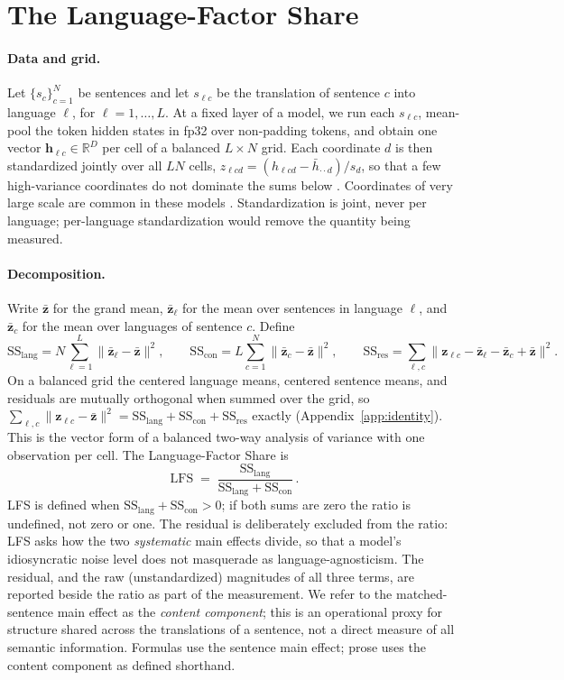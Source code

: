 \documentclass{article} %
\def\vh{{\bm{h}}}
\def\vz{{\bm{z}}}
\newcommand{\R}{\mathbb{R}}
\newcommand{\LFS}{\mathrm{LFS}}
\newcommand{\SSl}{\mathrm{SS}_{\mathrm{lang}}}
\newcommand{\SSc}{\mathrm{SS}_{\mathrm{con}}}
\newcommand{\SSr}{\mathrm{SS}_{\mathrm{res}}}
\begin{document}
\section{The Language-Factor Share}
\label{sec:method}

\paragraph{Data and grid.} Let $\{s_c\}_{c=1}^{N}$ be sentences and let
$s_{\ell c}$ be the translation of sentence $c$ into language $\ell$, for
$\ell = 1, \dots, L$. At a fixed layer of a model, we run each $s_{\ell c}$,
mean-pool the token hidden states in fp32 over non-padding tokens, and obtain
one vector $\vh_{\ell c} \in \R^{D}$ per cell of a balanced $L \times N$ grid.
Each coordinate $d$ is then standardized jointly over all $LN$ cells,
$z_{\ell c d} = (h_{\ell c d} - \bar h_{\cdot\cdot d}) / s_d$, so that a few
high-variance coordinates do not dominate the sums below
\citep{timkey2021rogue}. Coordinates of very large scale are common in these models \citep{kovaleva2021outlier,sun2024massive}. Standardization is joint, never per language;
per-language standardization would remove the quantity being measured.

\paragraph{Decomposition.} Write $\bar\vz$ for the grand mean, $\bar\vz_{\ell}$
for the mean over sentences in language $\ell$, and $\bar\vz_{c}$ for the mean
over languages of sentence $c$. Define
\begin{equation}
\SSl = N \sum_{\ell=1}^{L} \lVert \bar\vz_{\ell} - \bar\vz \rVert^2, \qquad
\SSc = L \sum_{c=1}^{N} \lVert \bar\vz_{c} - \bar\vz \rVert^2, \qquad
\SSr = \sum_{\ell, c} \lVert \vz_{\ell c} - \bar\vz_{\ell} - \bar\vz_{c} + \bar\vz \rVert^2 .
\label{eq:ss}
\end{equation}
On a balanced grid the centered language means, centered sentence means, and
residuals are mutually orthogonal when summed over the grid, so
$\sum_{\ell,c} \lVert \vz_{\ell c} - \bar\vz \rVert^2 = \SSl + \SSc + \SSr$
exactly (Appendix~\ref{app:identity}). This is the vector form of a balanced
two-way analysis of variance with one observation per cell. The
Language-Factor Share is
\begin{equation}
\LFS \;=\; \frac{\SSl}{\SSl + \SSc}\,.
\label{eq:lfs}
\end{equation}
LFS is defined when $\SSl + \SSc > 0$; if both sums are zero the ratio is
undefined, not zero or one. The residual is deliberately excluded from the ratio: LFS asks how the two
\emph{systematic} main effects divide, so that a model's idiosyncratic noise
level does not masquerade as language-agnosticism. The residual, and the raw
(unstandardized) magnitudes of all three terms, are reported beside the ratio
as part of the measurement. We refer to the matched-sentence main effect as
the \emph{content component}; this is an operational proxy for structure
shared across the translations of a sentence, not a direct measure of all
semantic information. Formulas use the sentence main effect; prose uses the
content component as defined shorthand.
\end{document}
